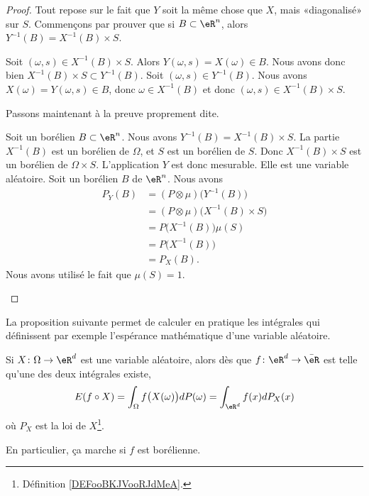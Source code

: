 \begin{proof}
	Tout repose sur le fait que \( Y\) soit la même chose que \( X\), mais «diagonalisé» sur \( S\). Commençons par prouver que si \( B\subset \eR^n\), alors \( Y^{-1}(B)=X^{-1}(B)\times S\).
	\begin{subproof}
		Soit \( (\omega,s)\in X^{-1}(B)\times S\). Alors \( Y(\omega,s)=X(\omega)\in B\). Nous avons donc bien \( X^{-1}(B)\times S\subset Y^{-1}(B)\).
		Soit \( (\omega,s)\in Y^{-1}(B)\). Nous avons \( X(\omega)= Y(\omega,s)\in B\), donc \( \omega\in X^{-1}(B)\) et donc \( (\omega,s)\in X^{-1}(B)\times S\).
	\end{subproof}
	Passons maintenant à la preuve proprement dite.
	\begin{subproof}
		\spitem[Pour \ref{ITEMooDSIKooSqdyJb}]
		Soit un borélien \( B\subset \eR^n\). Nous avons \( Y^{-1}(B)=X^{-1}(B)\times S\). La partie \( X^{-1}(B)\) est un borélien de \( \Omega\), et \( S\) est un borélien de \( S\). Donc \( X^{-1}(B)\times S\) est un borélien de \( \Omega\times S\). L'application \( Y\) est donc mesurable. Elle est une variable aléatoire.
		\spitem[Pour \ref{ITEMooQMMHooPcGKoD}]
		Soit un borélien \( B\) de \( \eR^n\). Nous avons
		\begin{subequations}
			\begin{align}
				P_Y(B) & =(P\otimes \mu)\big( Y^{-1}(B) \big)         \\
				       & =(P\otimes \mu)\big( X^{-1}(B)\times S \big) \\
				       & =P\big( X^{-1}(B) \big)\mu(S)                \\
				       & =P\big( X^{-1}(B) \big)                      \\
				       & =P_X(B).
			\end{align}
		\end{subequations}
		Nous avons utilisé le fait que \( \mu(S)=1\).
	\end{subproof}
\end{proof}

La proposition suivante permet de calculer en pratique les intégrales qui définissent par exemple l'espérance mathématique d'une variable aléatoire.
\begin{proposition}\label{PropintdPintdPXeR}
	Si \( X\colon \Omega\to \eR^d\) est une variable aléatoire, alors dès que \( f\colon \eR^d\to \bar\eR\) est telle qu'une des deux intégrales existe,
	\begin{equation}
		E(f\circ X)=\int_{\Omega}f\big( X(\omega) \big)dP(\omega)=\int_{\eR^d}f(x)dP_X(x)
	\end{equation}
	où \( P_X\) est la loi de \( X\)\footnote{Définition \ref{DEFooBKJVooRJdMeA}.}.

	En particulier, ça marche si \( f\) est borélienne.
\end{proposition}


